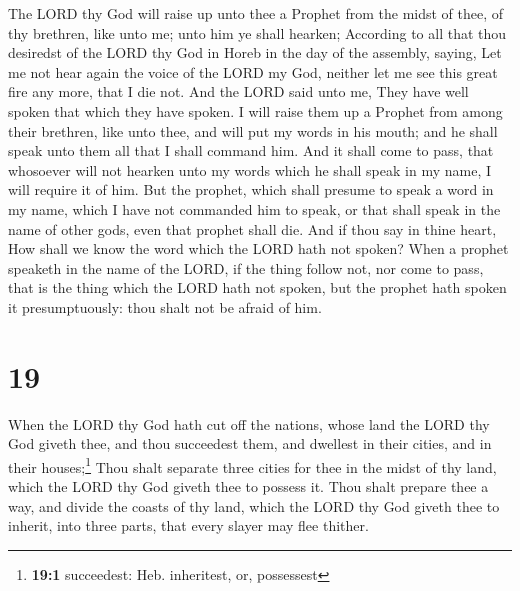  The LORD thy God will raise up unto thee a Prophet from
the midst of thee, of thy brethren, like unto me; unto him ye shall
hearken;  According to all that thou desiredst of the
LORD thy God in Horeb in the day of the assembly, saying, Let me not
hear again the voice of the LORD my God, neither let me see this great
fire any more, that I die not.  And the LORD said unto
me, They have well spoken that which they have spoken.  I
will raise them up a Prophet from among their brethren, like unto thee,
and will put my words in his mouth; and he shall speak unto them all
that I shall command him.  And it shall come to pass,
that whosoever will not hearken unto my words which he shall speak in my
name, I will require it of him.  But the prophet, which
shall presume to speak a word in my name, which I have not commanded him
to speak, or that shall speak in the name of other gods, even that
prophet shall die.  And if thou say in thine heart, How
shall we know the word which the LORD hath not spoken? 
When a prophet speaketh in the name of the LORD, if the thing follow
not, nor come to pass, that is the thing which the LORD hath not spoken,
but the prophet hath spoken it presumptuously: thou shalt not be afraid
of him.

\hypertarget{section-18}{%
\section{19}\label{section-18}}

 When the LORD thy God hath cut off the nations, whose
land the LORD thy God giveth thee, and thou succeedest them, and
dwellest in their cities, and in their houses;\footnote{\textbf{19:1}
  succeedest: Heb. inheritest, or, possessest}  Thou shalt
separate three cities for thee in the midst of thy land, which the LORD
thy God giveth thee to possess it.  Thou shalt prepare
thee a way, and divide the coasts of thy land, which the LORD thy God
giveth thee to inherit, into three parts, that every slayer may flee
thither.

